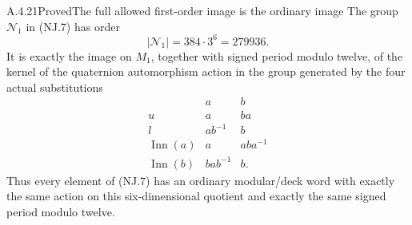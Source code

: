 \begin{result}{A.4.21}{Proved}{The full allowed first-order image is the ordinary image}
\label{prop:orthogonal-first-order-joint-normalizer}
The group \(\mathcal N_1\) in (NJ.7) has order
\[
                       |\mathcal N_1|=384\cdot3^6=279936.
 \tag{NJ.8}
\]
It is exactly the image on \(M_1\), together with signed period
modulo twelve, of the kernel of the quaternion automorphism action
in the group generated by the four actual substitutions
\[
 \begin{array}{c|cc}
       &a&b\\ \hline
 u&a&ba\\
 l&ab^{-1}&b\\
 \operatorname{Inn}(a)&a&aba^{-1}\\
 \operatorname{Inn}(b)&bab^{-1}&b.
 \end{array}
 \tag{NJ.9}
\]
Thus every element of (NJ.7) has an ordinary modular/deck word with
exactly the same action on this six-dimensional quotient and exactly
the same signed period modulo twelve.
\end{result}
